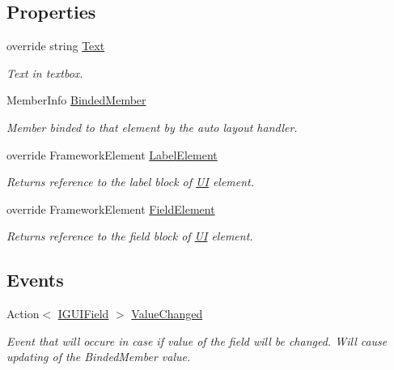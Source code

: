 \subsection*{Properties}
\begin{DoxyCompactItemize}
\item 
override string \mbox{\hyperlink{class_wpf_handler_1_1_u_i_1_1_controls_1_1_flat_password_box_a19e04b037d81228d50174d63e1ef30f6}{Text}}
\begin{DoxyCompactList}\small\item\em Text in textbox. \end{DoxyCompactList}\item 
Member\+Info \mbox{\hyperlink{class_wpf_handler_1_1_u_i_1_1_controls_1_1_flat_password_box_ab26770e33e5faaa79da66a5f12b6ed4c}{Binded\+Member}}
\begin{DoxyCompactList}\small\item\em Member binded to that element by the auto layout handler. \end{DoxyCompactList}\item 
override Framework\+Element \mbox{\hyperlink{class_wpf_handler_1_1_u_i_1_1_controls_1_1_flat_password_box_a12af7f9b9eff179c7155aa236f7fc234}{Label\+Element}}
\begin{DoxyCompactList}\small\item\em Returns reference to the label block of \mbox{\hyperlink{namespace_wpf_handler_1_1_u_i}{UI}} element. \end{DoxyCompactList}\item 
override Framework\+Element \mbox{\hyperlink{class_wpf_handler_1_1_u_i_1_1_controls_1_1_flat_password_box_ae661a35bf58daefd8b0c1dc19faed414}{Field\+Element}}
\begin{DoxyCompactList}\small\item\em Returns reference to the field block of \mbox{\hyperlink{namespace_wpf_handler_1_1_u_i}{UI}} element. \end{DoxyCompactList}\end{DoxyCompactItemize}
\subsection*{Events}
\begin{DoxyCompactItemize}
\item 
Action$<$ \mbox{\hyperlink{interface_wpf_handler_1_1_u_i_1_1_auto_layout_1_1_i_g_u_i_field}{I\+G\+U\+I\+Field}} $>$ \mbox{\hyperlink{class_wpf_handler_1_1_u_i_1_1_controls_1_1_flat_password_box_a9f85bdb8d3cf805ee1bc3d1d1580c176}{Value\+Changed}}
\begin{DoxyCompactList}\small\item\em Event that will occure in case if value of the field will be changed. Will cause updating of the Binded\+Member value. \end{DoxyCompactList}\end{DoxyCompactItemize}

